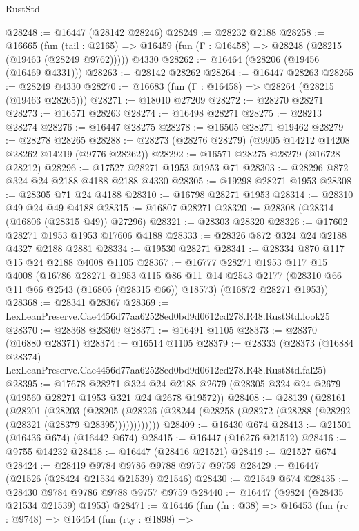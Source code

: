 \begin{lexlean}{RustStd}
\begin{coremodule}
@28248 := @16447 (@28142 @28246)
@28249 := @28232 @2188
@28258 := @16665
    (fun (tail : @2165) => @16459 (fun (Γ : @16458) => @28248 (@28215 (@19463 (@28249 @9762)))))
    @4330
@28262 := @16464 (@28206 (@19456 (@16469 @4331)))
@28263 := @28142 @28262
@28264 := @16447 @28263
@28265 := @28249 @4330
@28270 := @16683 (fun (Γ : @16458) => @28264 (@28215 (@19463 @28265)))
@28271 := @18010 @27209
@28272 := @28270 @28271
@28273 := @16571 @28263
@28274 := @16498 @28271
@28275 := @28213 @28274
@28276 := @16447 @28275
@28278 := @16505 @28271 @19462
@28279 := @28278 @28265
@28288 := @28273 (@28276 @28279) (@9905 @14212 @14208 @28262 @14219 (@9776 @28262))
@28292 := @16571 @28275 @28279 (@16728 @28212)
@28296 := @17527 @28271 @1953 @1953 @71
@28303 := @28296 @872 @324 @24 @2188 @4188 @2188 @4330
@28305 := @19298 @28271 @1953
@28308 := @28305 @71 @24 @4188
@28310 := @16798 @28271 @1953
@28314 := @28310 @49 @24 @49 @4188
@28315 := @16807 @28271
@28320 := @28308 (@28314 (@16806 (@28315 @49)) @27296)
@28321 := @28303 @28320
@28326 := @17602 @28271 @1953 @1953 @17606 @4188
@28333 := @28326 @872 @324 @24 @2188 @4327 @2188 @2881
@28334 := @19530 @28271
@28341 := @28334 @870 @117 @15 @24 @2188 @4008 @1105
@28367 := @16777
    @28271
    @1953
    @117
    @15
    @4008
    (@16786
      @28271
      @1953
      @115
      @86
      @11
      @14
      @2543
      @2177
      (@28310 @66 @11 @66 @2543 (@16806 (@28315 @66)) @18573)
      (@16872 @28271 @1953))
@28368 := @28341 @28367
@28369 := LexLeanPreserve.Cae4456d77aa62528ed0bd9d0612cd278.R48.RustStd.look25
@28370 := @28368 @28369
@28371 := @16491 @1105
@28373 := @28370 (@16880 @28371)
@28374 := @16514 @1105
@28379 := @28333
    (@28373 (@16884 @28374) LexLeanPreserve.Cae4456d77aa62528ed0bd9d0612cd278.R48.RustStd.fal25)
@28395 := @17678
    @28271
    @324
    @24
    @2188
    @2679
    (@28305 @324 @24 @2679 (@19560 @28271 @1953 @321 @24 @2678 @19572))
@28408 := @28139
    (@28161
      (@28201
        (@28203
          (@28205 (@28226 (@28244 (@28258 (@28272 (@28288 (@28292 (@28321 (@28379 @28395))))))))))))
@28409 := @16430 @674
@28413 := @21501 (@16436 @674) (@16442 @674)
@28415 := @16447 (@16276 @21512)
@28416 := @9755 @14232
@28418 := @16447 (@28416 @21521)
@28419 := @21527 @674
@28424 := @28419 @9784 @9786 @9788 @9757 @9759
@28429 := @16447 (@21526 (@28424 @21534 @21539) @21546)
@28430 := @21549 @674
@28435 := @28430 @9784 @9786 @9788 @9757 @9759
@28440 := @16447 (@9824 (@28435 @21534 @21539) @1953)
@28471 := @16446
    (fun (fn : @38) =>
    @16453
      (fun (rc : @9748) =>
      @16454
        (fun (rty : @1898) =>

\end{coremodule}
\end{lexlean}
